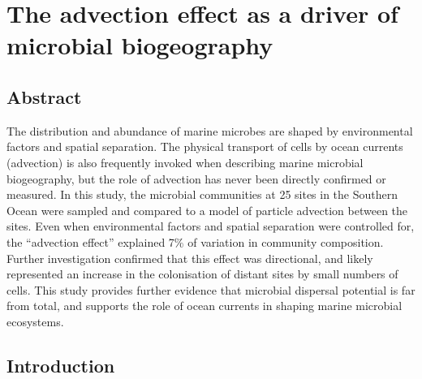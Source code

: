 \chapter[The advection effect]{The advection effect as a driver of microbial biogeography}
\label{ch:advection}


\section{Abstract}

The distribution and abundance of marine microbes are shaped by environmental factors and spatial separation.
The physical transport of cells by ocean currents (advection) is also frequently invoked when describing marine microbial biogeography, but the role of advection has never been directly confirmed or measured.
In this study, the microbial communities at 25 sites in the Southern Ocean were sampled and compared to a model of particle advection between the sites.
Even when environmental factors and spatial separation were controlled for, the ``advection effect'' explained 7\% of variation in community composition.
Further investigation confirmed that this effect was directional, and likely represented an increase in the colonisation of distant sites by small numbers of cells.
This study provides further evidence that microbial dispersal potential is far from total, and supports the role of ocean currents in shaping marine microbial ecosystems.

\section{Introduction}

